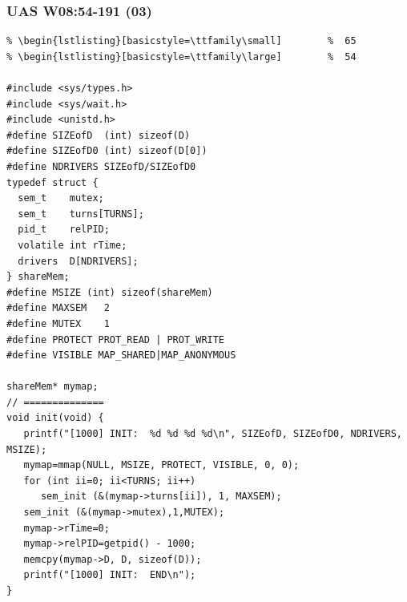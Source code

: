 \documentclass[xcolor=table, notheorems, hyperref={pdfpagelabels=false}]{beamer}
\begin{document}
\begin{frame}[fragile]
\frametitle{UAS W08:54-191 (03)}
\begin{lstlisting}[basicstyle=\ttfamily\tiny]         % 108
% \begin{lstlisting}[basicstyle=\ttfamily\footnotesize] %  72
% \begin{lstlisting}[basicstyle=\ttfamily\small]        %  65
% \begin{lstlisting}[basicstyle=\ttfamily\large]        %  54

#include <sys/types.h>
#include <sys/wait.h>
#include <unistd.h>
#define SIZEofD  (int) sizeof(D)
#define SIZEofD0 (int) sizeof(D[0])
#define NDRIVERS SIZEofD/SIZEofD0
typedef struct {
  sem_t    mutex;
  sem_t    turns[TURNS];
  pid_t    relPID;
  volatile int rTime;
  drivers  D[NDRIVERS];
} shareMem;
#define MSIZE (int) sizeof(shareMem)
#define MAXSEM   2
#define MUTEX    1
#define PROTECT PROT_READ | PROT_WRITE
#define VISIBLE MAP_SHARED|MAP_ANONYMOUS

shareMem* mymap;
// ==============
void init(void) {
   printf("[1000] INIT:  %d %d %d %d\n", SIZEofD, SIZEofD0, NDRIVERS, MSIZE);
   mymap=mmap(NULL, MSIZE, PROTECT, VISIBLE, 0, 0);
   for (int ii=0; ii<TURNS; ii++)
      sem_init (&(mymap->turns[ii]), 1, MAXSEM);
   sem_init (&(mymap->mutex),1,MUTEX);
   mymap->rTime=0;
   mymap->relPID=getpid() - 1000;
   memcpy(mymap->D, D, sizeof(D));
   printf("[1000] INIT:  END\n");
}   

\end{lstlisting}
\end{frame}
\end{document}
